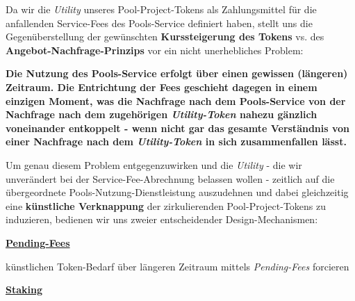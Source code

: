 \begin{Konzept}
\vspace{0.2cm}

Da wir die \textit{Utility} unseres Pool-Project-Tokens als Zahlungsmittel für die anfallenden Service-Fees des Pools-Service definiert haben, stellt uns die Gegenüberstellung der gewünschten \textbf{Kurssteigerung des Tokens} vs. des \textbf{Angebot-Nachfrage-Prinzips} vor ein nicht unerhebliches Problem:

\vspace{0.4cm}

\textbf{Die Nutzung des Pools-Service erfolgt über einen gewissen (längeren) Zeitraum. Die Entrichtung der Fees geschieht dagegen in einem einzigen Moment, was die Nachfrage nach dem Pools-Service von der Nachfrage nach dem zugehörigen \textit{Utility-Token} nahezu gänzlich voneinander ent\-koppelt - wenn nicht gar das gesamte Verständnis von einer Nachfrage nach dem \textit{Utility-Token} in sich zusammenfallen lässt.} 

\vspace{0.4cm}

Um genau diesem Problem entgegenzuwirken und die \textit{Utility} - die wir unverändert bei der Service-Fee-Abrechnung belassen wollen - zeitlich auf die übergeordnete Pools-Nutzung-Dienstleistung auszudehnen und dabei gleichzeitig eine \textbf{künstliche Verknappung} der zirkulierenden Pool-Project-Tokens zu induzieren, bedienen wir uns zweier entscheidender Design-Mechanismen:

\vspace{0.5cm}

\underline{\textbf{Pending-Fees}}

\vspace{0.3cm}

 künstlichen Token-Bedarf über längeren Zeitraum mittels \textit{Pending-Fees} forcieren


\vspace{0.75cm}

\underline{\textbf{Staking}}

\vspace{0.3cm}

\vspace{0.3cm}

\vspace{0.3cm}



\end{Konzept}
